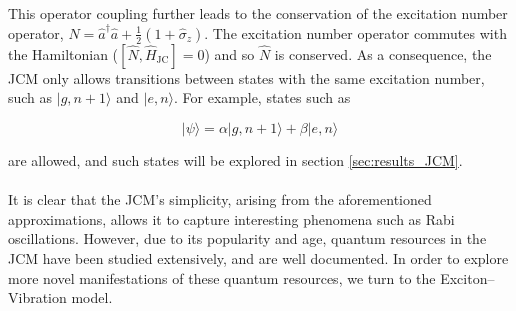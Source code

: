 \documentclass[11pt]{article}
\begin{document}
This operator coupling further leads to the conservation of the excitation number operator, $\hat{N} = \hat{a}^\dagger \hat{a} + \frac{1}{2}(1 + \hat{\sigma}_z)$. The excitation number operator commutes with the Hamiltonian ($[\hat{N}, \hat{H}_{\scriptscriptstyle \text{JC}}] = 0$) and so $\hat{N}$ is conserved. As a consequence, the JCM only allows transitions between states with the same excitation number, such as $|g, n+1\rangle$ and $|e,n\rangle$. For example, states such as

\begin{equation} \label{JCM_general_state}
    |\psi\rangle = \alpha|g,n+1\rangle + \beta|e,n\rangle
\end{equation} 

are allowed, and such states will be explored in section \ref{sec:results_JCM}.\\
\\
It is clear that the JCM's simplicity, arising from the aforementioned approximations, allows it to capture interesting phenomena such as Rabi oscillations. However, due to its popularity and age, quantum resources in the JCM have been studied extensively, and are well documented. In order to explore more novel manifestations of these quantum resources, we turn to the Exciton--Vibration model. 

\end{document}
